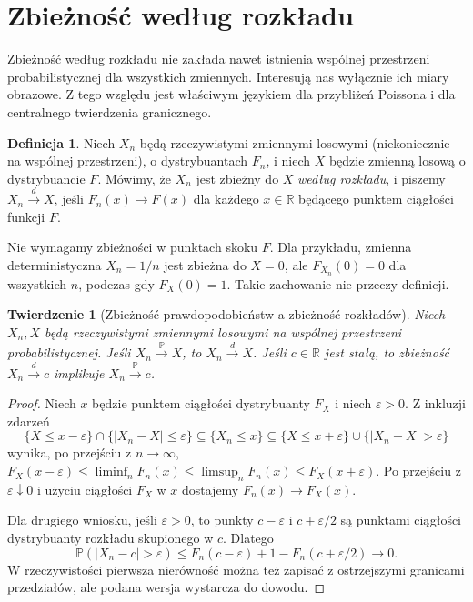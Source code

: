 \documentclass[11pt,a4paper,oneside]{report}
\numberwithin{equation}{chapter}
\theoremstyle{plain}
\newtheorem{twierdzenie}{Twierdzenie}[chapter]
\theoremstyle{definition}
\newtheorem{definicja}{Definicja}[chapter]
\theoremstyle{remark}
\newcommand{\R}{\mathbb{R}}
\newcommand{\Prob}{\mathbb{P}}
\begin{document}
\section{Zbieżność według rozkładu}

Zbieżność według rozkładu nie zakłada nawet istnienia
wspólnej przestrzeni probabilistycznej dla wszystkich
zmiennych. Interesują nas wyłącznie ich miary obrazowe.
Z tego względu jest właściwym językiem dla
przybliżeń Poissona i dla centralnego twierdzenia granicznego.

\begin{definicja}
Niech $X_n$ będą rzeczywistymi zmiennymi losowymi
(niekoniecznie na wspólnej przestrzeni), o dystrybuantach
$F_n$, i niech $X$ będzie zmienną losową o dystrybuancie
$F$. Mówimy, że $X_n$ jest zbieżny do $X$
\emph{według rozkładu}, i piszemy $X_n\xrightarrow{d}X$,
jeśli $F_n(x)\to F(x)$ dla każdego $x\in\R$ będącego
punktem ciągłości funkcji $F$.
\end{definicja}

Nie wymagamy zbieżności w punktach skoku $F$.
Dla przykładu, zmienna deterministyczna $X_n=1/n$
jest zbieżna do $X=0$, ale $F_{X_n}(0)=0$ dla
wszystkich $n$, podczas gdy $F_X(0)=1$.
Takie zachowanie nie przeczy definicji.

\begin{twierdzenie}[Zbieżność prawdopodobieństw a zbieżność rozkładów]
Niech $X_n,X$ będą rzeczywistymi zmiennymi losowymi
na wspólnej przestrzeni probabilistycznej.
Jeśli $X_n\xrightarrow{\Prob}X$, to
$X_n\xrightarrow{d}X$.
Jeśli $c\in\R$ jest stałą, to zbieżność
$X_n\xrightarrow{d}c$ implikuje
$X_n\xrightarrow{\Prob}c$.
\end{twierdzenie}
\begin{proof}
Niech $x$ będzie punktem ciągłości dystrybuanty $F_X$
i niech $\varepsilon>0$. Z inkluzji zdarzeń
\[
\{X\leq x-\varepsilon\}\cap\{|X_n-X|\leq\varepsilon\}
\subseteq\{X_n\leq x\}
\subseteq\{X\leq x+\varepsilon\}\cup
\{|X_n-X|>\varepsilon\}
\]
wynika, po przejściu z $n\to\infty$,
$F_X(x-\varepsilon)\leq\liminf_nF_n(x)
\leq\limsup_nF_n(x)\leq F_X(x+\varepsilon)$.
Po przejściu z $\varepsilon\downarrow0$ i użyciu
ciągłości $F_X$ w $x$ dostajemy $F_n(x)\to F_X(x)$.

Dla drugiego wniosku, jeśli $\varepsilon>0$,
to punkty $c-\varepsilon$ i $c+\varepsilon/2$
są punktami ciągłości dystrybuanty rozkładu
skupionego w $c$. Dlatego
\[
\Prob(|X_n-c|>\varepsilon)
\leq F_n(c-\varepsilon)
 +1-F_n(c+\varepsilon/2)\longrightarrow0.
\]
W rzeczywistości pierwsza nierówność można też
zapisać z ostrzejszymi granicami przedziałów,
ale podana wersja wystarcza do dowodu.
\end{proof}
\end{document}
